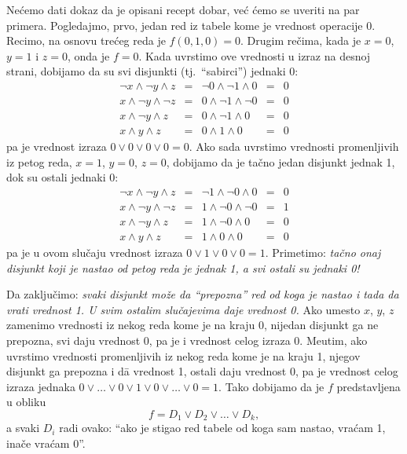 Ne\'cemo dati dokaz da je opisani recept dobar, ve\'c \'cemo se uveriti
na par primera. Pogledajmo, prvo, jedan red iz tabele kome je vrednost
operacije 0. Recimo, na osnovu tre\'ceg reda je $f(0,1,0) = 0$. Drugim
re\v cima, kada je $x = 0$, $y = 1$ i $z = 0$, onda je $f = 0$. Kada
uvrstimo ove vrednosti u izraz na desnoj strani, dobijamo da su svi
disjunkti (tj.\ \enquote{sabirci}) jednaki 0:
$$
    \begin{array}{lclcl}
        \lnot x \land \lnot y \land z
            &=& \lnot 0 \land \lnot 1 \land 0
            &=& 0 \\[1mm]
        x \land \lnot y \land \lnot z
            &=& 0 \land \lnot 1 \land \lnot 0
            &=& 0 \\[1mm]
        x \land \lnot y \land z
            &=&
            0 \land \lnot 1 \land 0
            &=& 0 \\[1mm]
        x \land y \land z
            &=&
            0 \land 1 \land 0
            &=& 0
    \end{array}
$$
pa je vrednost izraza $0 \lor 0 \lor 0 \lor 0 = 0$. Ako sada uvrstimo
vrednosti promenljivih iz petog reda, $x = 1$, $y = 0$, $z = 0$,
dobijamo da je ta\v cno jedan disjunkt jednak 1, dok su ostali jednaki 0:
$$
    \begin{array}{lclcl}
        \lnot x \land \lnot y \land z
            &=& \lnot 1 \land \lnot 0 \land 0
            &=& 0 \\[1mm]
        x \land \lnot y \land \lnot z
            &=& 1 \land \lnot 0 \land \lnot 0
            &=& 1 \\[1mm]
        x \land \lnot y \land z
            &=&
            1 \land \lnot 0 \land 0
            &=& 0 \\[1mm]
        x \land y \land z
            &=&
            1 \land 0 \land 0
            &=& 0
    \end{array}
$$
pa je u ovom slu\v caju vrednost izraza $0 \lor 1 \lor 0 \lor 0 = 1$.
Primetimo: \emph{ta\v cno onaj disjunkt koji je nastao od petog reda je
jednak 1, a svi ostali su jednaki 0!}

Da zaklju\v cimo: \emph{svaki disjunkt mo\v ze da \enquote{prepozna} red od koga
je nastao i tada da vrati vrednost 1. U svim ostalim slu\v cajevima
daje vrednost 0.} Ako umesto $x$, $y$, $z$ zamenimo vrednosti iz nekog
reda kome je na kraju 0, nijedan disjunkt ga ne prepozna, svi daju
vrednost 0, pa je i vrednost celog izraza 0. Me\dj utim, ako uvrstimo
vrednosti promenljivih iz nekog reda kome je na kraju 1, njegov disjunkt
ga prepozna i d\=a vrednost 1, ostali daju vrednost 0, pa je vrednost celog
izraza jednaka $0 \lor \ldots \lor 0 \lor 1 \lor 0 \lor \ldots \lor 0 = 1$.
Tako dobijamo da je $f$ predstavljena u obliku
$$
    f = D_1 \lor D_2 \lor \ldots \lor D_k,
$$
a svaki $D_i$ radi ovako: \enquote{ako je stigao red tabele od koga sam
nastao, vra\'cam 1, ina\v ce vra\'cam 0}.


